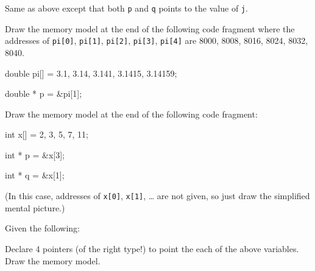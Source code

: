 \begin{ex}
Same as above except that both \texttt{p} and \texttt{q}
points to the value of \texttt{j}.
\end{ex}

\begin{ex}
Draw the memory model at the end of the following code fragment where the addresses of \texttt{pi[0]}, \texttt{pi[1]}, \texttt{pi[2]}, \texttt{pi[3]}, \texttt{pi[4]} are 8000, 8008, 8016, 8024, 8032, 8040.
\end{ex}

\begin{consolethree}[escapeinside=||]

double pi[] = {3.1, 3.14, 3.141, 3.1415, 3.14159};

double * p = &pi[1];
\end{consolethree}

\begin{ex}
Draw the memory model at the end of the following code fragment:

\begin{consolethree}[escapeinside=||]

int x[] = {2, 3, 5, 7, 11};

int * p = &x[3];

int * q = &x[1];
\end{consolethree}
(In this case, addresses of \texttt{x[0]}, \texttt{x[1]}, \ldots{}
are not given, so just draw the simplified mental picture.)
\end{ex}

\begin{ex}
Given the following:


Declare 4 pointers (of the right type!) to point the each of the above variables. Draw the memory model.
\end{ex}

